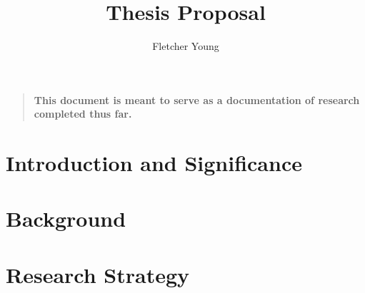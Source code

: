 \documentclass[runningheads,a4paper]{llncs}
\newenvironment{sciabstract}{%
\begin{quote} \bf}
{\end{quote}}
\begin{document}
	\mainmatter  %
	\title{Thesis Proposal}
	\author{Fletcher Young}%
	
	\maketitle
	\begin{sciabstract}
		This document is meant to serve as a documentation of research completed thus far.
	\end{sciabstract}

\section{Introduction and Significance}
\section{Background}
\section{Research Strategy}
\end{document}
